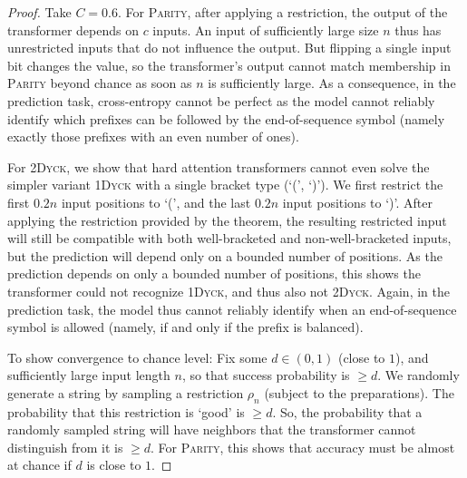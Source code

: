 \documentclass[11pt,a4paper]{article}
\newcounter{theorem}
\begin{document}
\begin{proof}
Take $C=0.6$.
For \textsc{Parity}, after applying a restriction, the output of the transformer depends on $c$ inputs.
An input of sufficiently large size $n$ thus has unrestricted inputs that do not influence the output.
But flipping a single input bit changes the value, so the transformer's output cannot match membership in \textsc{Parity} beyond chance as soon as $n$ is sufficiently large.
As a consequence, in the prediction task, cross-entropy cannot be perfect as the model cannot reliably identify which prefixes can be followed by the end-of-sequence symbol (namely exactly those prefixes with an even number of ones). 


For \textsc{2Dyck}, we show that hard attention transformers cannot even solve the simpler variant \textsc{1Dyck} with a single bracket type (`(', `)').
We first restrict the first $0.2n$ input positions to `(', and the last $0.2n$ input positions to `)'.
After applying the restriction provided by the theorem, the resulting restricted input will still be compatible with both well-bracketed and non-well-bracketed inputs, but the prediction will depend only on a bounded number of positions.
As the prediction depends on only a bounded number of positions, this shows the transformer could not recognize \textsc{1Dyck}, and thus also not \textsc{2Dyck}.
Again, in the prediction task, the model thus cannot reliably identify when an end-of-sequence symbol is allowed (namely, if and only if the prefix is balanced).

To show convergence to chance level:
Fix some $d \in (0,1)$ (close to $1$), and sufficiently large input length $n$, so that success probability is $\geq d$.
We randomly generate a string by sampling a restriction $\rho_n$ (subject to the preparations).
The probability that this restriction is `good' is $\geq d$.
So, the probability that a randomly sampled string will have neighbors that the transformer cannot distinguish from it is $\geq d$.
For \textsc{Parity}, this shows that accuracy must be almost at chance if $d$ is close to $1$.

%
\end{proof}
\end{document}
